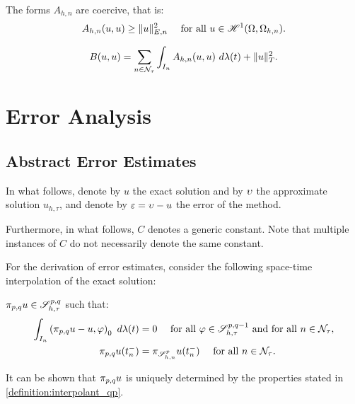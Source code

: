 \begin{lemma}[Coercivity of $A_{h, n}$]
    The forms $A_{h, n}$ are coercive, that is:
    \begin{gather}
        A_{h, n}(u, u) \geq \lVert u \rVert_{E, n}^2 \quad \text{ for all } u \in \mathscr{H}^{1}(\Omega, \Omega_{h, n}).
    \end{gather}
\end{lemma}

\begin{lemma}[Coercivity of $B$]
    \begin{gather}
        B(u, u) = \sum_{n \in \mathcal{N}_{\tau}} \int_{I_n} A_{h, n}(u, u) ~ d \lambda(t) + \lVert u \rVert_{T}^2.
    \end{gather}
\end{lemma}

\newpage
\section{Error Analysis}

\subsection{Abstract Error Estimates}

In what follows, denote by $u$ the exact solution and by $\upsilon$ the approximate solution $u_{h, \tau}$, and denote by $\varepsilon = \upsilon - u$ the error of the method.

Furthermore, in what follows, $C$ denotes a generic constant. Note that multiple instances of $C$ do not necessarily denote the same constant.

For the derivation of error estimates, consider the following space-time interpolation of the exact solution:

\begin{definition}[$\IntU$] \label{definition:interpolant_qp}
    $\pi_{p, q} u \in \mathscr{S}^{p, q}_{h, \tau}$ such that:
    \begin{align}
        \int_{I_n} \left( \pi_{p, q} u - u, \varphi \right)_0 ~ d \lambda(t) &= 0 \quad \text{ for all } \varphi \in \mathscr{S}^{p, q - 1}_{h, \tau} \text{ and for all } n \in \mathcal{N}_{\tau}, \\
        \pi_{p, q} u(t_n^-) &= \pi_{\mathscr{S}^p_{h, n}} u(t_n^-) \quad \text{ for all } n \in \mathcal{N}_{\tau}.
    \end{align}
\end{definition}

It can be shown that $\IntU$ is uniquely determined by the properties stated in \cref{definition:interpolant_qp}.

